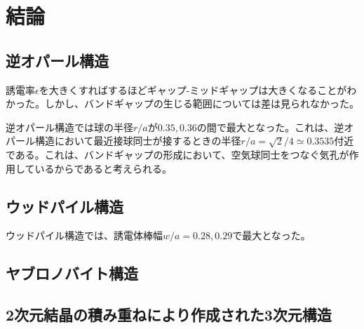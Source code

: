 \documentclass[platex,dvipdfmx]{jsreport}
\numberwithin{equation}{section}
\begin{document}
\chapter{結論}

\section{逆オパール構造}
誘電率$\epsilon$を大きくすればするほどギャップ-ミッドギャップは大きくなることがわかった。しかし、バンドギャップの生じる範囲については差は見られなかった。

逆オパール構造では球の半径$r / a$が$0.35, 0.36$の間で最大となった。これは、逆オパール構造において最近接球同士が接するときの半径$r / a = \sqrt{2} / 4 \simeq 0.3535$付近である。これは、バンドギャップの形成において、空気球同士をつなぐ気孔が作用しているからであると考えられる。



\section{ウッドパイル構造}
ウッドパイル構造では、誘電体棒幅$w / a = 0.28, 0.29$で最大となった。

\section{ヤブロノバイト構造}


\section{2次元結晶の積み重ねにより作成された3次元構造}
\end{document}
